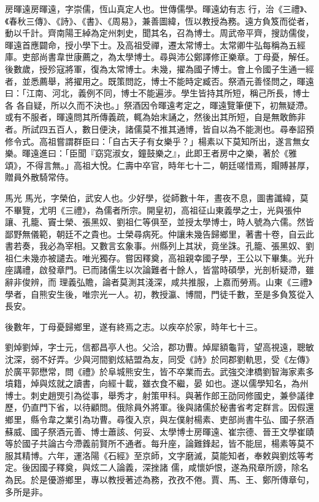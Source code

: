 \begin{pinyinscope}
 房暉遠房暉遠，字崇儒，恆山真定人也。世傳儒學。暉遠幼有志
 行，治《三禮》、《春秋三傳》、《詩》、《書》、《周易》，兼善圖緯，恆以教授為務。遠方負笈而從者，動以千計。齊南陽王綽為定州刺史，聞其名，召為博士。周武帝平齊，搜訪儒俊，暉遠首應闢命，授小學下士。及高祖受禪，遷太常博士。太常卿牛弘每稱為五經庫。吏部尚書韋世康薦之，為太學博士。尋與沛公鄭譯修正樂章。丁母憂，解任。後數歲，授殄寇將軍，復為太常博士。未幾，擢為國子博士。會上令國子生通一經者，並悉薦舉，將擢用之。既策問訖，博士不能時定臧否。祭酒元善怪問之，暉遠曰：「江南、河北，義例不同，博士不能遍涉。學生皆持其所短，稱己所長，博士各
 各自疑，所以久而不決也。」祭酒因令暉遠考定之，暉遠覽筆便下，初無疑滯。或有不服者，暉遠問其所傳義疏，輒為始末誦之，然後出其所短，自是無敢飾非者。所試四五百人，數日便決，諸儒莫不推其通博，皆自以為不能測也。尋奉詔預修令式。高祖嘗謂群臣曰：「自古天子有女樂乎？」楊素以下莫知所出，遂言無女樂。暉遠進曰：「臣聞『窈窕淑女，鐘鼓樂之』，此即王者房中之樂，著於《雅頌》，不得言無。」高祖大悅。仁壽中卒官，時年七十二，朝廷嗟惜焉，賵賻甚厚，贈員外散騎常侍。



 馬光
 馬光，字榮伯，武安人也。少好學，從師數十年，晝夜不息，圖書讖緯，莫不畢覽，尤明《三禮》，為儒者所宗。開皇初，高祖征山東義學之士，光與張仲讓、孔籠、竇士榮、張黑奴、劉祖仁等俱至，並授太學博士，時人號為六儒。然皆鄙野無儀範，朝廷不之貴也。士榮尋病死。仲讓未幾告歸鄉里，著書十卷，自云此書若奏，我必為宰相。又數言玄象事。州縣列上其狀，竟坐誅。孔籠、張黑奴、劉祖仁未幾亦被譴去。唯光獨存。嘗因釋奠，高祖親幸國子學，王公以下畢集。光升座講禮，啟發章門。已而諸儒生以次論難者十餘人，皆當時碩學，光剖析疑滯，雖辭非俊辨，而
 理義弘贍，論者莫測其淺深，咸共推服，上嘉而勞焉。山東《三禮》學者，自熊安生後，唯宗光一人。初，教授瀛、博間，門徒千數，至是多負笈從入長安。



 後數年，丁母憂歸鄉里，遂有終焉之志。以疾卒於家，時年七十三。



 劉焯劉焯，字士元，信都昌亭人也。父洽，郡功曹。焯犀額龜背，望高視遠，聰敏沈深，弱不好弄。少與河間劉炫結盟為友，同受《詩》於同郡劉軌思，受《左傳》於廣平郭懋常，問《禮》於阜城熊安生，皆不卒業而去。武強交津橋劉智海家素多墳籍，焯與炫就之讀書，向經十載，雖衣食不繼，晏
 如也。遂以儒學知名，為州博士。刺史趙煚引為從事，舉秀才，射策甲科。與著作郎王劭同修國史，兼參議律歷，仍直門下省，以待顧問。俄除員外將軍。後與諸儒於秘書省考定群言。因假還鄉里，縣令韋之業引為功曹。尋復入京，與左僕射楊素、吏部尚書牛弘、國子祭酒蘇威、國子祭酒元善、博士蕭該、何妥、太學博士房暉遠、崔宗德、晉王文學崔賾等於國子共論古今滯義前賢所不通者。每升座，論難鋒起，皆不能屈，楊素等莫不服其精博。六年，運洛陽《石經》至京師，文字磨滅，莫能知者，奉敕與劉炫等考定。後因國子釋奠，與炫二人論義，深挫諸
 儒，咸懷妒恨，遂為飛章所謗，除名為民。於是優游鄉里，專以教授著述為務，孜孜不倦。賈、馬、王、鄭所傳章句，多所是非。




\end{pinyinscope}
